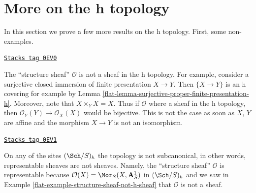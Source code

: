 \section{More on the h topology}
\label{flat-section-h-more}
In this section we prove a few more results on the h topology.
First, some non-examples.

\begin{example}
\label{flat-example-structure-sheaf-not-h-sheaf}
\href{https://stacks.math.columbia.edu/tag/0EV0}{\texttt{Stacks tag 0EV0}}

The ``structure sheaf'' $\mathcal{O}$ is not a sheaf in the h topology.
For example, consider a surjective closed immersion of finite
presentation $X \to Y$. Then $\{X \to Y\}$ is an h covering
for example by Lemma \ref{flat-lemma-surjective-proper-finite-presentation-h}.
Moreover, note that $X \times_Y X = X$.
Thus if $\mathcal{O}$ where a sheaf in the h topology, then
$\mathcal{O}_Y(Y) \to \mathcal{O}_X(X)$ would be bijective.
This is not the case as soon as $X$, $Y$ are affine and the morphism
$X \to Y$ is not an isomorphism.
\end{example}

\begin{example}
\label{flat-example-representable-sheaf-not-h-sheaf}
\href{https://stacks.math.columbia.edu/tag/0EV1}{\texttt{Stacks tag 0EV1}}

On any of the sites $(\Sch/S)_h$ the topology is not subcanonical,
in other words, representable sheaves are not sheaves.
Namely, the ``structure sheaf'' $\mathcal{O}$ is representable
because $\mathcal{O}(X) = \Mor_S(X, \mathbf{A}^1_S)$
in $(\Sch/S)_h$ and we saw in
Example \ref{flat-example-structure-sheaf-not-h-sheaf}
that $\mathcal{O}$ is not a sheaf.
\end{example}

